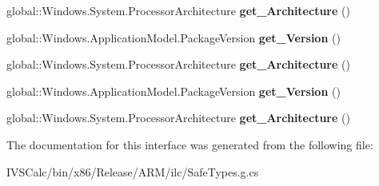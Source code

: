 \begin{DoxyCompactItemize}
global\+::\+Windows.\+System.\+Processor\+Architecture {\bfseries get\+\_\+\+Architecture} ()
\item 
\mbox{\label{interface_windows_1_1_application_model_1_1_i_package_id_a3a5d9d80b1a97ae25ba7c42179b36e31}} 
global\+::\+Windows.\+Application\+Model.\+Package\+Version {\bfseries get\+\_\+\+Version} ()
\item 
\mbox{\label{interface_windows_1_1_application_model_1_1_i_package_id_ac226374b004231aa33fa80b5b15b7bda}} 
global\+::\+Windows.\+System.\+Processor\+Architecture {\bfseries get\+\_\+\+Architecture} ()
\item 
\mbox{\label{interface_windows_1_1_application_model_1_1_i_package_id_a3a5d9d80b1a97ae25ba7c42179b36e31}} 
global\+::\+Windows.\+Application\+Model.\+Package\+Version {\bfseries get\+\_\+\+Version} ()
\item 
\mbox{\label{interface_windows_1_1_application_model_1_1_i_package_id_ac226374b004231aa33fa80b5b15b7bda}} 
global\+::\+Windows.\+System.\+Processor\+Architecture {\bfseries get\+\_\+\+Architecture} ()
\end{DoxyCompactItemize}


The documentation for this interface was generated from the following file\+:\begin{DoxyCompactItemize}
\item 
I\+V\+S\+Calc/bin/x86/\+Release/\+A\+R\+M/ilc/Safe\+Types.\+g.\+cs\end{DoxyCompactItemize}
